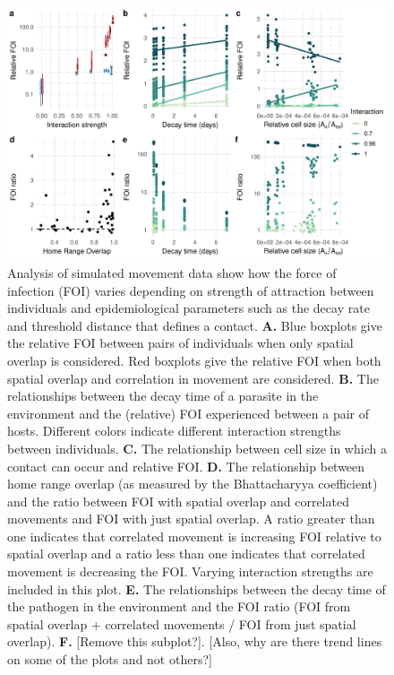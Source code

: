 \documentclass[letterpaper]{article}
\begin{document}
\begin{figure}
    \includegraphics[width=\textwidth]{figures/sim_results.pdf}
    \caption{Analysis of simulated movement data show how the force of infection (FOI) varies depending on strength of attraction between individuals and epidemiological parameters such as the decay rate and threshold distance that defines a contact.  \textbf{A.} Blue boxplots give the relative FOI between pairs of individuals when only spatial overlap is considered. Red boxplots give the relative FOI when both spatial overlap and correlation in movement are considered.  \textbf{B.} The relationships between the decay time of a parasite in the environment and the (relative) FOI experienced between a pair of hosts. Different colors indicate different interaction strengths between individuals. \textbf{C.} The relationship between cell size in which a contact can occur and relative FOI. \textbf{D.} The relationship between home range overlap (as measured by the Bhattacharyya coefficient) and the ratio between FOI with spatial overlap and correlated movements and FOI with just spatial overlap.  A ratio greater than one indicates that correlated movement is increasing FOI relative to spatial overlap and a ratio less than one indicates that correlated movement is decreasing the FOI. Varying interaction strengths are included in this plot. \textbf{E.} The relationships between the decay time of the pathogen in the environment and the FOI ratio (FOI from spatial overlap + correlated movements / FOI from just spatial overlap). \textbf{F.} [Remove this subplot?]. [Also, why are there trend lines on some of the plots and not others?] }
	\label{fig:simresults}
\end{figure}
\end{document}
